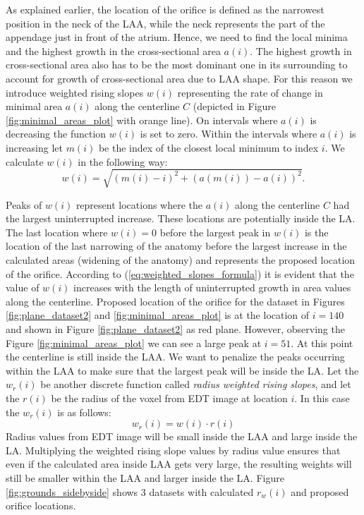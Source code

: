 \documentclass[review]{elsarticle}
\begin{document}
As explained earlier, the location of the orifice is defined as the narrowest
position in the neck of the LAA, while the neck represents the part of the
appendage just in front of the atrium. Hence, we need to find the local minima
and the highest growth in the cross-sectional area $a(i)$.  The highest growth
in cross-sectional area also has to be the most dominant one in its surrounding
to account for growth of cross-sectional area due to LAA shape. For this reason
we introduce weighted rising slopes $w(i)$ representing the rate of change in
minimal area $a(i)$ along the centerline $C$ (depicted in Figure
\ref{fig:minimal_areas_plot} with orange line). On intervals where $a(i)$ is
decreasing the function $w(i)$ is set to zero. Within the intervals where
$a(i)$ is increasing let $m(i)$ be the index of the closest local minimum to
index $i$. We calculate $w(i)$ in the following way:
\begin{equation}
  \label{eq:weighted_slopes_formula}
  w(i) = \sqrt{ (m(i)-i)^2 + (a(m(i)) - a(i))^2 }.%
\end{equation}


Peaks of $w(i)$ represent locations where the $a(i)$ along the centerline $C$
had the largest uninterrupted increase. These locations are potentially inside
the LA.  The last location where $w(i) = 0$ before the largest peak in $w(i)$
is the location of the last narrowing of the anatomy before the largest
increase in the calculated areas (widening of the anatomy) and represents the
proposed location of the orifice.  According to
(\ref{eq:weighted_slopes_formula}) it is evident that the value of $w(i)$
increases with the length of uninterrupted growth in area values along the
centerline. Proposed location of the orifice for the dataset in Figures
\ref{fig:plane_dataset2} and \ref{fig:minimal_areas_plot} is at the location of
$i=140$ and shown in Figure \ref{fig:plane_dataset2} as red plane.  However,
observing the Figure \ref{fig:minimal_areas_plot} we can see a large peak at
$i=51$. At this point the centerline is still inside the LAA.  We want to
penalize the peaks occurring within the LAA to make sure that the largest peak
will be inside the LA. Let the $w_r(i)$ be another discrete function called
\emph{radius weighted rising slopes}, and let the $r(i)$ be the radius of the
voxel from EDT image at location $i$.  In this case the $w_r(i)$ is as
follows:
\begin{equation}
  \label{eq:weights_radius}
  w_r(i) = w(i) \cdot r(i)
\end{equation}
Radius values from  EDT image will be small inside the LAA and large inside
the LA.  Multiplying the weighted rising slope values by radius value ensures
that even if the calculated area inside LAA gets very large, the resulting
weights will still be smaller within the LAA and larger inside the LA. Figure
\ref{fig:grounds_sidebyside} shows 3 datasets with calculated $r_w(i)$ and
proposed orifice locations.
\end{document}
